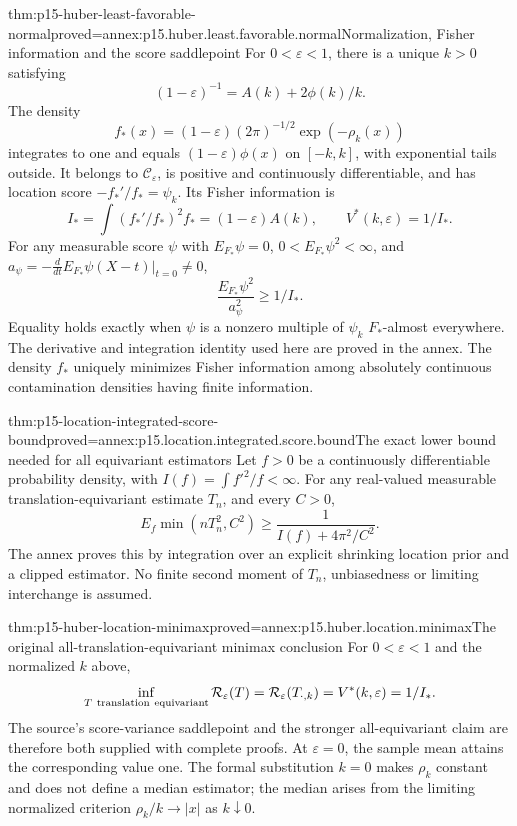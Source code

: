 \begin{hbtheorem}{thm:p15-huber-least-favorable-normal}{proved=annex:p15.huber.least.favorable.normal}{Normalization, Fisher information and the score saddlepoint}
For \(0<\varepsilon<1\), there is a unique \(k>0\) satisfying
\[
 (1-\varepsilon)^{-1}=A(k)+2\phi(k)/k.
\]
The density
\[
 f_*(x)=(1-\varepsilon)(2\pi)^{-1/2}\exp(-\rho_k(x))
\]
integrates to one and equals
\((1-\varepsilon)\phi(x)\) on \([-k,k]\), with exponential tails
outside. It belongs to \(\mathcal C_\varepsilon\), is positive and
continuously differentiable, and has location score
\(-f_*'/f_*=\psi_k\). Its Fisher information is
\[
 I_*=\int(f_*'/f_*)^2f_*=(1-\varepsilon)A(k),
 \qquad V^*(k,\varepsilon)=1/I_*.
\]
For any measurable score \(\psi\) with \(E_{F_*}\psi=0\),
\(0<E_{F_*}\psi^2<\infty\), and
\(a_\psi=-\frac{d}{dt}E_{F_*}\psi(X-t)|_{t=0}\ne0\),
\[
 \frac{E_{F_*}\psi^2}{a_\psi^2}\geq1/I_*.
\]
Equality holds exactly when \(\psi\) is a nonzero multiple of \(\psi_k\)
\(F_*\)-almost everywhere. The derivative and integration identity
used here are proved in the annex.
The density \(f_*\) uniquely minimizes Fisher information among
absolutely continuous contamination densities having finite information.
\end{hbtheorem}

\begin{hbtheorem}{thm:p15-location-integrated-score-bound}{proved=annex:p15.location.integrated.score.bound}{The exact lower bound needed for all equivariant estimators}
Let \(f>0\) be a continuously differentiable probability density,
with \(I(f)=\int f'^2/f<\infty\). For any real-valued measurable
translation-equivariant estimate \(T_n\), and every \(C>0\),
\[
 E_f\min(nT_n^2,C^2)\geq
                 \frac1{I(f)+4\pi^2/C^2}.
\]
The annex proves this by integration over an explicit shrinking
location prior and a clipped estimator. No finite second moment
of \(T_n\), unbiasedness or limiting interchange is assumed.
\end{hbtheorem}

\begin{hbtheorem}{thm:p15-huber-location-minimax}{proved=annex:p15.huber.location.minimax}{The original all-translation-equivariant minimax conclusion}
For \(0<\varepsilon<1\) and the normalized \(k\) above,
\[
 \inf_{T\ {\rm translation\ equivariant}}
        \mathcal R_\varepsilon(T)
 =\mathcal R_\varepsilon(T_{\cdot,k})
 =V^*(k,\varepsilon)=1/I_*.
\]
The source's score-variance saddlepoint and the stronger all-equivariant
claim are therefore both supplied with complete proofs.
At \(\varepsilon=0\), the sample mean attains the corresponding value one.
The formal substitution \(k=0\) makes \(\rho_k\) constant and does
not define a median estimator; the median arises from the limiting
normalized criterion \(\rho_k/k\to|x|\) as \(k\downarrow0\).
\end{hbtheorem}

